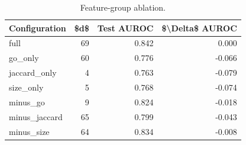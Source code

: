 \begin{table}[htbp]
\centering
\caption{Feature-group ablation.}
\label{tab:ablation_recomputed}
\begin{tabular}{lrrr}
\toprule
Configuration & \$d\$ & Test AUROC & \$\textbackslash Delta\$ AUROC \\
\midrule
full & 69 & 0.842 & 0.000 \\
go\_only & 60 & 0.776 & -0.066 \\
jaccard\_only & 4 & 0.763 & -0.079 \\
size\_only & 5 & 0.768 & -0.074 \\
minus\_go & 9 & 0.824 & -0.018 \\
minus\_jaccard & 65 & 0.799 & -0.043 \\
minus\_size & 64 & 0.834 & -0.008 \\
\bottomrule
\end{tabular}

\end{table}
